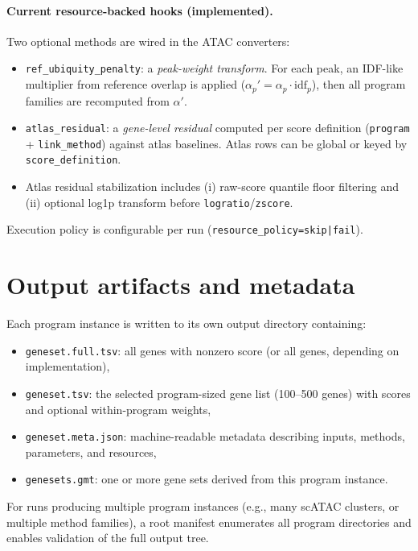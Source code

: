 \documentclass[11pt]{article}
\begin{document}
\paragraph{Current resource-backed hooks (implemented).}
Two optional methods are wired in the ATAC converters:
\begin{itemize}[leftmargin=2em]
\item \texttt{ref\_ubiquity\_penalty}: a \emph{peak-weight transform}. For each peak, an IDF-like multiplier from reference overlap is applied ($\alpha_p'=\alpha_p\cdot\mathrm{idf}_p$), then all program families are recomputed from $\alpha'$.
\item \texttt{atlas\_residual}: a \emph{gene-level residual} computed per score definition (\texttt{program} + \texttt{link\_method}) against atlas baselines. Atlas rows can be global or keyed by \texttt{score\_definition}.
\item Atlas residual stabilization includes (i) raw-score quantile floor filtering and (ii) optional log1p transform before \texttt{logratio}/\texttt{zscore}.
\end{itemize}
Execution policy is configurable per run (\texttt{resource\_policy=skip|fail}).

\section{Output artifacts and metadata}
Each program instance is written to its own output directory containing:
\begin{itemize}[leftmargin=2em]
\item \texttt{geneset.full.tsv}: all genes with nonzero score (or all genes, depending on implementation),
\item \texttt{geneset.tsv}: the selected program-sized gene list (100--500 genes) with scores and optional within-program weights,
\item \texttt{geneset.meta.json}: machine-readable metadata describing inputs, methods, parameters, and resources,
\item \texttt{genesets.gmt}: one or more gene sets derived from this program instance.
\end{itemize}
For runs producing multiple program instances (e.g., many scATAC clusters, or multiple method families), a root manifest enumerates all program directories and enables validation of the full output tree.
\end{document}
